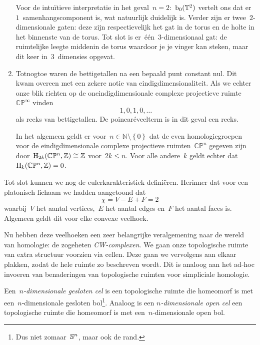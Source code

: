 \documentclass[a4paper,11pt,openany,oneside,article]{memoir}
\begin{document}
\begin{example}
\begin{enumerate}
      Voor de intu\"itieve interpretatie in het geval~$n=2$:~$\mathrm{b}_0(\mathbb{T}^2)$ vertelt ons dat er~$1$~samenhangscomponent is, wat natuurlijk duidelijk is. Verder zijn er twee~$2$\nobreakdash-dimensionale gaten: deze zijn respectievelijk het gat in de torus en de holte in het binnenste van de torus. Tot slot is er~\'e\'en~$3$\nobreakdash-dimensionaal gat: de ruimtelijke leegte middenin de torus waardoor je je vinger kan steken, maar dit keer in~$3$~dimensies opgevat.
      
    \item Totnogtoe waren de bettigetallen na een bepaald punt constant nul. Dit kwam overeen met een zekere notie van eindigdimensionaliteit. Als we echter onze blik richten op de oneindigdimensionale complexe projectieve ruimte~$\mathbb{C}\mathbb{P}^{\infty}$ vinden
      \begin{equation}
        1,0,1,0,\ldots
      \end{equation}
      als reeks van bettigetallen. De poincar\'eveelterm is in dit geval een reeks.

      In het algemeen geldt er voor~$n\in\mathbb{N}\setminus\left\{ 0 \right\}$ dat de even homologiegroepen voor de eindigdimensionale complexe projectieve ruimten~$\mathbb{C}\mathbb{P}^n$ gegeven zijn door~$\mathrm{H}_{2k}(\mathbb{C}\mathbb{P}^n,\mathbb{Z})\cong\mathbb{Z}$ voor~$2k\leq n$. Voor alle andere~$k$ geldt echter dat~$\mathrm{H}_{k}(\mathbb{C}\mathbb{P}^n,\mathbb{Z})=0$.
  \end{enumerate}
\end{example}

Tot slot kunnen we nog de eulerkarakteristiek defini\"eren. Herinner dat voor een platonisch lichaam we hadden aangetoond dat
\begin{equation}
  \chi=V-E+F=2
\end{equation}
waarbij~$V$ het aantal vertices,~$E$ het aantal edges en~$F$ het aantal faces is. Algemeen geldt dit voor elke convexe veelhoek.

Nu hebben deze veelhoeken een zeer belangrijke veralgemening naar de wereld van homologie: de zogeheten \emph{CW\nobreakdash-complexen}. We gaan onze topologische ruimte van extra structuur voorzien via cellen. Deze gaan we vervolgens aan elkaar plakken, zodat de hele ruimte zo beschreven wordt. Dit is analoog aan het ad-hoc invoeren van benaderingen van topologische ruimten voor simpliciale homologie.

\begin{definition}
  Een~\emph{$n$-dimensionale gesloten cel} is een topologische ruimte die homeomorf is met een~$n$-dimensionale gesloten bol\footnote{Dus niet zomaar~$\mathbb{S}^n$, maar ook de rand.}. Analoog is een \emph{$n$\nobreakdash-dimensionale open cel} een topologische ruimte die homeomorf is met een~$n$-dimensionale open bol.
\end{definition}
\end{document}
